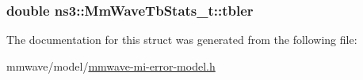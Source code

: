 \subsubsection[{\texorpdfstring{tbler}{tbler}}]{\setlength{\rightskip}{0pt plus 5cm}double ns3\+::\+Mm\+Wave\+Tb\+Stats\+\_\+t\+::tbler}\hypertarget{structns3_1_1MmWaveTbStats__t_a9442403a142e9b6d5c226356b2dee04e}{}\label{structns3_1_1MmWaveTbStats__t_a9442403a142e9b6d5c226356b2dee04e}


The documentation for this struct was generated from the following file\+:\begin{DoxyCompactItemize}
\item 
mmwave/model/\hyperlink{mmwave-mi-error-model_8h}{mmwave-\/mi-\/error-\/model.\+h}\end{DoxyCompactItemize}
